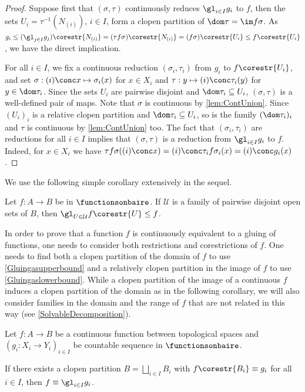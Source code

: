 \begin{proof}
Suppose first that $(\sigma,\tau)$ continuously reduces $\gl_{i\in I}g_i$ to $f$, then the sets $U_i=\tau^{-1}(N_{(i)})$, $i\in I$, 
form a clopen partition of $\dom \tau=\im f\sigma$. 
As $g_i\leq(\gl_{j\in I}g_j)\corestr{N_{(i)}}=(\tau f\sigma)\corestr{N_{(i)}}=(f\sigma)\corestr{U_i}\leq f\corestr{U_i}$, we have the direct implication.

For all $i\in I$, we fix a continuous reduction $(\sigma_i,\tau_i)$ from $g_i$ to $f\corestr{U_i}$,
and set $\sigma:(i)\conc x\mapsto\sigma_i(x)$ for $x\in X_i$ and $\tau: y\mapsto (i)\conc \tau_i(y)$ for $y\in \dom \tau_i$.
Since the sets $U_i$ are pairwise disjoint and $\dom \tau_i\subseteq U_i$, $(\sigma,\tau)$ is a well-defined pair of maps. Note that $\sigma$ is continuous by \cref{lem:ContUnion}.
Since $(U_i)_i$ is a relative clopen partition and $\dom \tau_i\subseteq U_i$, so is the family $(\dom \tau_i)_i$ and $\tau$ is continuous by \cref{lem:ContUnion} too.
The fact that $(\sigma_i,\tau_i)$ are reductions for all $i\in I$ implies that $(\sigma, \tau)$ is a reduction from $\gl_{i\in I}g_i$ to $f$.
Indeed, for $x\in X_i$ we have $\tau f \sigma ((i)\conc x)=(i)\conc \tau_i f \sigma_i(x)= (i)\conc g_i(x)$.
\end{proof}

We use the following simple corollary extensively in the sequel.

\begin{corollary}\label{Gluingaslowerbound2}
Let $f:A\to B$ be in $\functionsonbaire$. If $\mathcal{U}$ is a family of pairwise disjoint open sets of $B$, then $\gl_{U\in\mathcal{U}}f\corestr{U}\leq f$.
\end{corollary}

In order to prove that a function $f$ is continuously equivalent to a gluing of functions, one needs to consider both restrictions and corestrictions of $f$. 
One needs to find both a clopen partition of the domain of $f$ to use \cref{Gluingasupperbound} and a relatively clopen partition in the image of $f$
to use \cref{Gluingaslowerbound}.
While a clopen partition of the image of a continuous $f$ induces a clopen partition of the domain as in the following corollary,
we will also consider families in the domain and the range of $f$ that are not related in this way (see \cref{SolvableDecomposition}).

\begin{corollary}\label{UsefulcriterionforequivFinGl}
Let $f:A\to B$ be a continuous function between topological spaces
and $(g_i:X_i\to Y_i)_{i\in I}$ be countable sequence in $\functionsonbaire$.

If there exists a clopen partition $B=\bigsqcup_{i\in I} B_i$ with $f\corestr{B_i}\equiv g_i$ for all $i\in I$, then $f\equiv \gl_{i\in I} g_i$.
\end{corollary}


